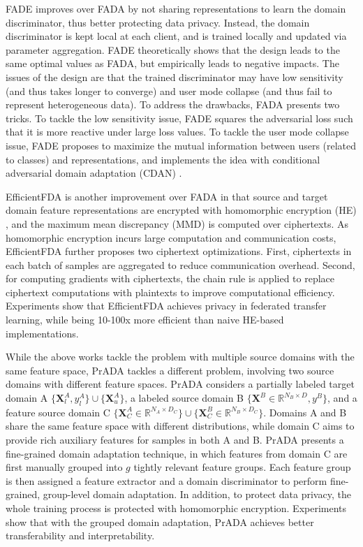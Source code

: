 \documentclass[11pt]{article}
\begin{document}
FADE \cite{Yilun-hong2021federated} improves over FADA by not sharing representations to learn the domain discriminator, thus better protecting data privacy. Instead, the domain discriminator is kept local at each client, and is trained locally and updated via parameter aggregation. FADE theoretically shows that the design leads to the same optimal values as FADA, but empirically leads to negative impacts. The issues of the design are that the trained discriminator may have low sensitivity (and thus takes longer to converge) and user mode collapse (and thus fail to represent heterogeneous data). To address the drawbacks, FADA presents two tricks. To tackle the low sensitivity issue, FADE squares the adversarial loss such that it is more reactive under large loss values. To tackle the user mode collapse issue, FADE proposes to maximize the mutual information between users (related to classes) and representations, and implements the idea with conditional adversarial domain adaptation (CDAN) \cite{Yilun-long2018conditional}.

EfficientFDA \cite{Yilun-kang2022communicational} is another improvement over FADA in that source and target domain feature representations are encrypted with homomorphic encryption (HE) \cite{Yilun-aono2017privacy}, and the maximum mean discrepancy (MMD) \cite{Yilun-long2015learning} is computed over ciphertexts. As homomorphic encryption incurs large computation and communication costs, EfficientFDA further proposes two ciphertext optimizations. First, ciphertexts in each batch of samples are aggregated to reduce communication overhead. Second, for computing gradients with ciphertexts, the chain rule is applied to replace ciphertext computations with plaintexts to improve computational efficiency. Experiments show that EfficientFDA achieves privacy in federated transfer learning, while being 10-100x more efficient than naive HE-based implementations.

While the above works tackle the problem with multiple source domains with the same feature space, PrADA \cite{Yilun-kang2022privacy} tackles a different problem, involving two source domains with different feature spaces. PrADA considers a partially labeled target domain A $\{\mathbf{X}_l^A, y_l^A\}\cup \{\mathbf{X}^A_u\}$, a labeled source domain B $\{\mathbf{X}^B\in\mathbb{R}^{N_B\times D}, y^B\}$, and a feature source domain C $\{\mathbf{X}^A_C\in \mathbb{R}^{N_A\times D_C}\}\cup \{\mathbf{X}^B_C\in\mathbb{R}^{N_B\times D_C}\}$. Domains A and B share the same feature space with different distributions, while domain C aims to provide rich auxiliary features for samples in both A and B. PrADA presents a fine-grained domain adaptation technique, in which features from domain C are first manually grouped into $g$ tightly relevant feature groups. Each feature group is then assigned a feature extractor and a domain discriminator to perform fine-grained, group-level domain adaptation. In addition, to protect data privacy, the whole training process is protected with homomorphic encryption. Experiments show that with the grouped domain adaptation, PrADA achieves better transferability and interpretability.
\end{document}
